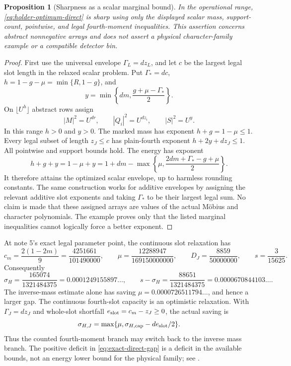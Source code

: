 \documentclass[11pt]{article}
\newtheorem{proposition}[theorem]{Proposition}
\theoremstyle{definition}
\begin{document}
\begin{proposition}[Sharpness as a scalar marginal bound]
\label{prop:scalar-sharpness-direct}
In the operational range, \eqref{eq:holder-optimum-direct} is sharp
using only the displayed scalar mass, support-count, pointwise, and
legal fourth-moment inequalities.  This assertion concerns abstract
nonnegative arrays and does not assert a physical character-family
example or a compatible detector bin.
\end{proposition}
\begin{proof}
First use the universal envelope \(\Gamma_L=dz_L\), and let \(c\)
be the largest legal slot length in the relaxed scalar problem.  Put
\(\Gamma_* =dc\), \(h=1-g-\mu=\min\{R,1-g\}\), and
\[
 y=\min\left\{dm,\frac{g+\mu-\Gamma_*}{2}\right\}.
\]
On \(\lfloor U^h\rfloor\) abstract rows assign
\[
 |M|^2=U^{dr},\qquad |Q_i|^2=U^{dz_i},\qquad |S|^2=U^y.
\]
In this range \(h>0\) and \(y>0\).  The marked mass has exponent
\(h+g=1-\mu\le1\).  Every legal subset of length \(z_J\le c\)
has plain-fourth exponent
\(h+2y+dz_J\le1\).  All pointwise and support bounds hold.  The
energy has exponent
\[
 h+g+y=1-\mu+y
 =1+dm-\max\left\{\mu,
      \frac{2dm+\Gamma_*-g+\mu}{2}\right\}.
\]
It therefore attains the optimized scalar envelope, up to harmless
rounding constants.  The same construction works for additive
envelopes by assigning the relevant additive slot exponents and
taking \(\Gamma_*\) to be their largest legal sum.  No claim is made
that these assigned arrays are values of the actual Möbius and
character polynomials.  The example proves only that the listed
marginal inequalities cannot logically force a better exponent.
\end{proof}

At note 5's exact legal parameter point, the continuous slot relaxation
has
\[
 c_m=\frac{2(1-2m)}9=\frac{4251661}{101490000},\qquad
 \mu=\frac{12288947}{169150000000},\qquad
 D_J=\frac{8859}{50000000},\qquad s=\frac3{15625}.
\]
Consequently
\begin{equation}
 \sigma_H=\frac{165074}{1321484375}
       =0.0001249155897\ldots,
 \qquad
 s-\sigma_H=\frac{88651}{1321484375}
       =0.0000670844103\ldots.
 \label{eq:exact-direct-gap}
\end{equation}
The inverse-mass estimate alone has saving
\(\mu=0.0000726511794\ldots\), and hence a larger gap.  The
continuous fourth-slot capacity is an optimistic relaxation.  With
\(\Gamma_J=dz_J\) and whole-slot shortfall
\(e_{\rm slot}=c_m-z_J\ge0\), the actual saving is
\begin{equation}
 \sigma_{H,J}=\max\{\mu,
             \sigma_{H,\rm cap}-de_{\rm slot}/2\}.
 \label{eq:actual-slot-holder-saving}
\end{equation}
Thus the counted fourth-moment branch may switch back to the inverse
mass branch.  The positive deficit in \eqref{eq:exact-direct-gap}
is a deficit in the available bounds, not an energy lower bound for
the physical family; see \cite{n5,n6}.
\end{document}
